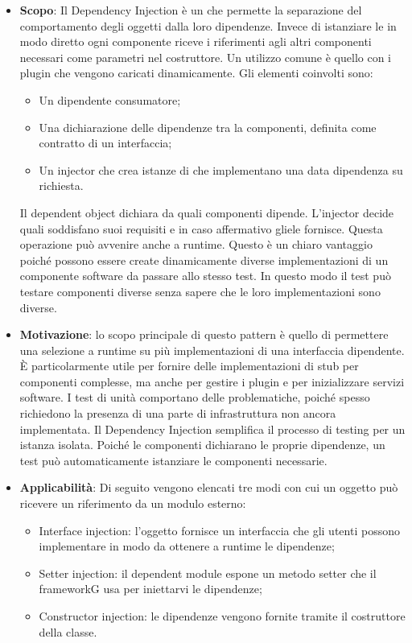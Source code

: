 		\begin{itemize}
		\item \textbf{Scopo}: Il Dependency Injection è un  che permette la separazione del comportamento degli oggetti dalla loro dipendenze. Invece di istanziare le  in modo diretto ogni componente riceve i riferimenti agli altri componenti necessari come parametri nel costruttore. Un utilizzo comune è quello con i plugin che vengono caricati dinamicamente. Gli elementi coinvolti sono:
\begin{itemize}
\item Un dipendente consumatore;
\item Una dichiarazione delle dipendenze tra la componenti, definita come contratto di un interfaccia;
\item Un injector che crea istanze di  che implementano una data dipendenza su richiesta.
\end{itemize}
Il dependent object dichiara da quali componenti dipende. L’injector decide quali  soddisfano suoi requisiti e in caso affermativo gliele fornisce. Questa operazione può avvenire anche a runtime. Questo è un chiaro vantaggio poiché possono essere create dinamicamente diverse implementazioni di un componente software da passare allo stesso test. In questo modo il test può testare componenti diverse senza sapere che le loro implementazioni sono diverse.
\item \textbf{Motivazione}: lo scopo principale di questo pattern è quello di permettere una selezione a runtime su più implementazioni di una interfaccia dipendente. È particolarmente utile per fornire delle implementazioni di stub per componenti complesse, ma anche per gestire i plugin e per inizializzare servizi software. I test di unità comportano delle problematiche, poiché spesso richiedono la presenza di una parte di infrastruttura non ancora implementata. Il Dependency Injection semplifica il processo di testing per un istanza isolata. Poiché le componenti dichiarano le proprie dipendenze, un test può automaticamente istanziare le componenti necessarie.
\item \textbf{Applicabilità}: Di seguito vengono elencati tre modi con cui un oggetto può ricevere un riferimento da un modulo esterno:
\begin{itemize}
\item Interface injection: l’oggetto fornisce un interfaccia che gli utenti possono implementare
in modo da ottenere a runtime le dipendenze;
\item Setter injection: il dependent module espone un metodo setter che il frameworkG usa per
iniettarvi le dipendenze;
\item Constructor injection: le dipendenze vengono fornite tramite il costruttore della classe.
\end{itemize}

		\end{itemize}
